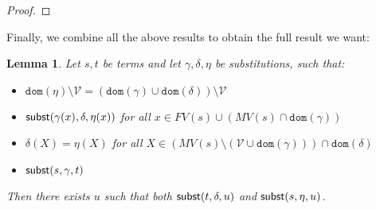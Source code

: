 \documentclass{lmcs}
\theoremstyle{theorem}\newtheorem{theorem}{Theorem}
\theoremstyle{theorem}\newtheorem{lemma}[theorem]{Lemma}
\theoremstyle{theorem}\newtheorem{corollary}[theorem]{Corollary}
\theoremstyle{definition}\newtheorem{definition}[theorem]{Definition}
\theoremstyle{definition}\newtheorem{example}[theorem]{Example}
\newcommand{\V}{\mathcal{V}}
\newcommand{\FV}{\mathit{FV}}
\newcommand{\FMV}{\mathit{MV}}
\newcommand{\domain}{\mathtt{dom}}
\newcommand{\avar}{x}
\newcommand{\bvar}{y}
\newcommand{\cvar}{z}
\newcommand{\Avar}{X}
\newcommand{\abs}[2]{\lambda #1.#2}
\newcommand{\meta}[2]{#1\langle#2\rangle}
\begin{document}
\begin{proof}
\end{proof}

Finally, we combine all the above results to obtain the full result we want:

\begin{lemma}\label{lem:combinesubst}
Let $s,t$ be terms and let $\gamma,\delta,\eta$ be substitutions, such that:
\begin{itemize}
\item $\domain(\eta) \setminus \V = (\domain(\gamma) \cup \domain(\delta))
  \setminus \V$
\item $\subrel{\gamma(\avar),\delta,\eta(\avar)}$ for all $\avar \in \FV(s)
  \cup (\FMV(s) \cap \domain(\gamma))$
\item $\delta(\Avar) = \eta(\Avar)$ for all $\Avar \in (\FMV(s) \setminus
  (\V \cup \domain(\gamma))) \cap \domain(\delta)$
\item $\mathsf{subst}(s,\gamma,t)$
\end{itemize}
Then there exists $u$ such that both $\mathsf{subst}(t,\delta,u)$ and
$\mathsf{subst}(s,\eta,u)$.
\end{lemma}
\end{document}
